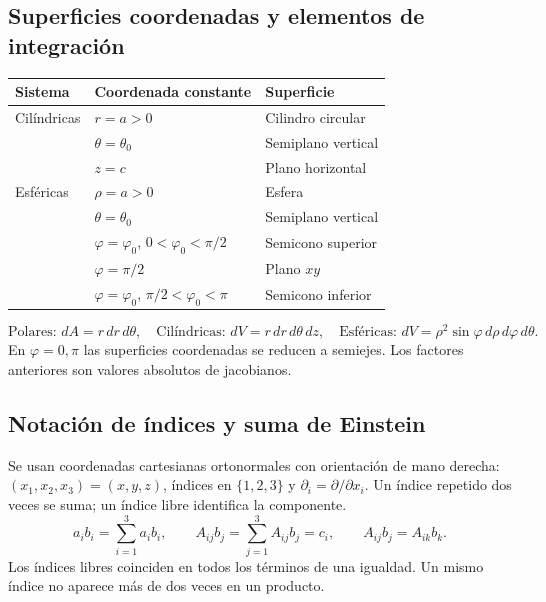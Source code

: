 \subsection*{Superficies coordenadas y elementos de integración}
\renewcommand{\arraystretch}{1.5}
\begin{center}
\begin{tabular}{lll}
\hline
Sistema & Coordenada constante & Superficie\\\hline
Cilíndricas & $r=a>0$ & Cilindro circular\\
 & $\theta=\theta_0$ & Semiplano vertical\\
 & $z=c$ & Plano horizontal\\
Esféricas & $\rho=a>0$ & Esfera\\
 & $\theta=\theta_0$ & Semiplano vertical\\
 & $\varphi=\varphi_0$, $0<\varphi_0<\pi/2$ & Semicono superior\\
 & $\varphi=\pi/2$ & Plano $xy$\\
 & $\varphi=\varphi_0$, $\pi/2<\varphi_0<\pi$ & Semicono inferior\\\hline
\end{tabular}
\end{center}
\[
\text{Polares: }dA=r\,dr\,d\theta,\quad
\text{Cilíndricas: }dV=r\,dr\,d\theta\,dz,\quad
\text{Esféricas: }dV=\rho^2\sin\varphi\,d\rho\,d\varphi\,d\theta.
\]
En $\varphi=0,\pi$ las superficies coordenadas se reducen a semiejes.
Los factores anteriores son valores absolutos de jacobianos.

\newpage
\subsection*{Notación de índices y suma de Einstein}
Se usan coordenadas cartesianas ortonormales con orientación de mano derecha:
$(x_1,x_2,x_3)=(x,y,z)$, índices en $\{1,2,3\}$ y $\partial_i=\partial/\partial x_i$.
Un índice repetido dos veces se suma; un índice libre identifica la componente.
\[
a_ib_i=\sum_{i=1}^3a_ib_i,\qquad
A_{ij}b_j=\sum_{j=1}^3A_{ij}b_j=c_i,\qquad
A_{ij}b_j=A_{ik}b_k.
\]
Los índices libres coinciden en todos los términos de una igualdad.
Un mismo índice no aparece más de dos veces en un producto.


